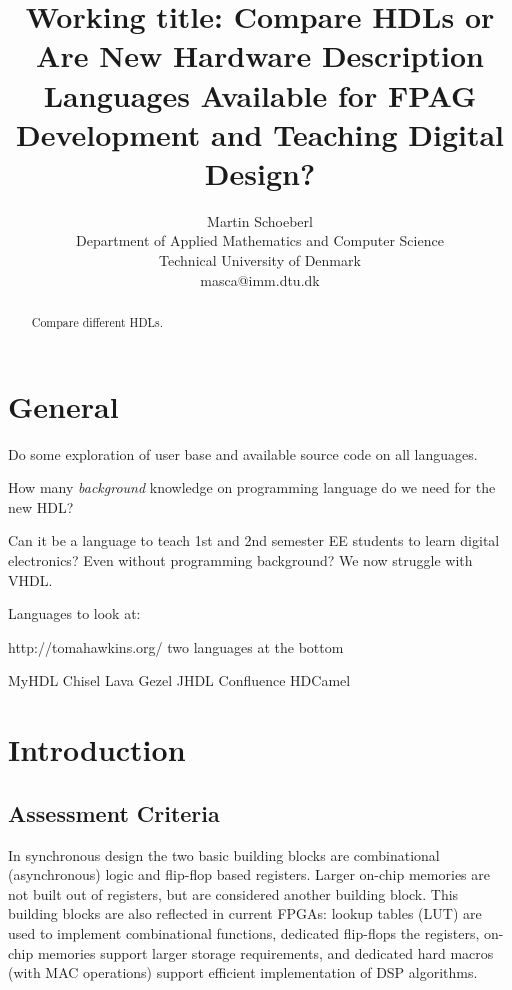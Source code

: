 \documentclass[10pt, conference, compsocconf]{IEEEtran}
\begin{document}
\title{Working title: Compare HDLs or\\
Are New Hardware Description Languages Available for FPAG
Development and Teaching Digital Design?}

\author{Martin Schoeberl\\
Department of Applied Mathematics and Computer Science\\
Technical University of Denmark\\
masca@imm.dtu.dk}


\maketitle \thispagestyle{empty}

\begin{abstract}
Compare different HDLs.
\end{abstract}

\section{General}

Do some exploration of user base and available source code on all languages.

How many \emph{background} knowledge on programming language do we need for the new HDL?

Can it be a language to teach 1st and 2nd semester EE students to learn digital
electronics? Even without programming background? We now struggle with VHDL.

Languages to look at:

http://tomahawkins.org/ two languages at the bottom

MyHDL
Chisel
Lava
Gezel
JHDL
Confluence
HDCamel


\section{Introduction}

\subsection{Assessment Criteria}


In synchronous design the two basic building blocks are combinational
(asynchronous) logic and flip-flop based registers. Larger on-chip
memories are not built out of registers, but are considered another building
block. This building blocks are also reflected in current FPGAs: lookup tables
(LUT) are used to implement combinational functions, dedicated flip-flops
the registers, on-chip memories support larger storage requirements,
and dedicated hard macros (with MAC operations) support efficient
implementation of DSP algorithms.
\end{document}
